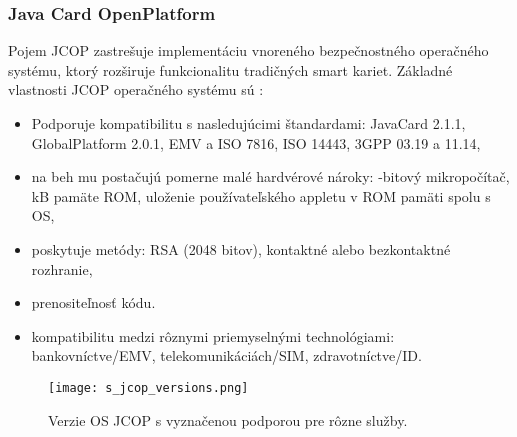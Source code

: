 \documentclass[12pt,a4paper,oneside,openright]{report}
\begin{document}
\subsubsection{Java Card OpenPlatform} \label{s_jcop}
Pojem JCOP zastrešuje implementáciu vnoreného bezpečnostného operačného \\ systému, ktorý rozširuje funkcionalitu tradičných smart kariet. \cite{jcopz} 
Základné vlastnosti JCOP operačného systému sú \cite{jcop}:
\begin{itemize}
	\item Podporuje kompatibilitu s nasledujúcimi štandardami:
	\subitem JavaCard 2.1.1,
	\subitem GlobalPlatform 2.0.1,
	\subitem EMV a ISO 7816,
	\subitem ISO 14443,
	\subitem 3GPP 03.19 a 11.14,
	\item na beh mu postačujú pomerne malé hardvérové nároky:
	-bitový mikropočítač,
	 kB pamäte ROM,
	\subitem uloženie používateľského appletu v ROM pamäti spolu s OS,
	\item poskytuje metódy:
	\subitem RSA (2048 bitov),
	\subitem kontaktné alebo bezkontaktné rozhranie,
	\item prenositeľnosť kódu.
	\item kompatibilitu medzi rôznymi priemyselnými technológiami:
	\subitem bankovníctve/EMV,
	\subitem telekomunikáciách/SIM,
	\subitem zdravotníctve/ID.
\end{itemize}
\onehalfspacing

\begin{figure*}[h]
	\centering
	\texttt{[image: s\_jcop\_versions.png]}
	\caption{Verzie OS JCOP s vyznačenou podporou pre rôzne služby. \cite{jcop}}
	\label{f:o_jcop_0}
\end{figure*}
%
\end{document}
